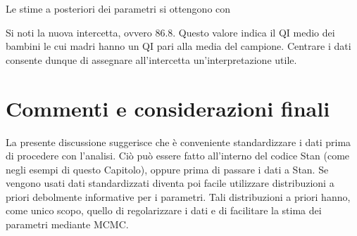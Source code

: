 \documentclass[
  11pt,
]{krantz}
\makeatletter
\newenvironment{Shaded}{\begin{snugshade}}{\end{snugshade}}
\newcommand{\CommentTok}[1]{\textcolor[rgb]{0.37,0.37,0.37}{\textit{#1}}}
\newcommand{\FunctionTok}[1]{\textcolor[rgb]{0,0,0}{#1}}
\newcommand{\NormalTok}[1]{#1}
\newcommand{\SpecialCharTok}[1]{\textcolor[rgb]{0,0,0}{#1}}
\newcommand{\StringTok}[1]{\textcolor[rgb]{0.5,0.5,0.5}{#1}}
\newenvironment{kframe}{%
\medskip{}
\setlength{\fboxsep}{.8em}
 \def\at@end@of@kframe{}%
 \ifinner\ifhmode%
  \def\at@end@of@kframe{\end{minipage}}%
  \begin{minipage}{\columnwidth}%
 \fi\fi%
 \def\FrameCommand##1{\hskip\@totalleftmargin \hskip-\fboxsep
 \colorbox{shadecolor}{##1}\hskip-\fboxsep
     \hskip-\linewidth \hskip-\@totalleftmargin \hskip\columnwidth}%
 \MakeFramed {\advance\hsize-\width
   \@totalleftmargin\z@ \linewidth\hsize
   \@setminipage}}%
 {\par\unskip\endMakeFramed%
 \at@end@of@kframe}
\renewenvironment{Shaded}{\begin{kframe}}{\end{kframe}}
\makeatother
\begin{document}
Le stime a posteriori dei parametri si ottengono con

\begin{Shaded}
\end{Shaded}

Si noti la nuova intercetta, ovvero 86.8. Questo valore indica il QI medio dei bambini le cui madri hanno un QI pari alla media del campione. Centrare i dati consente dunque di assegnare all'intercetta un'interpretazione utile.

\hypertarget{commenti-e-considerazioni-finali-1}{%
\section*{Commenti e considerazioni finali}\label{commenti-e-considerazioni-finali-1}}


La presente discussione suggerisce che è conveniente standardizzare i dati prima di procedere con l'analisi. Ciò può essere fatto all'interno del codice Stan (come negli esempi di questo Capitolo), oppure prima di passare i dati a Stan. Se vengono usati dati standardizzati diventa poi facile utilizzare distribuzioni a priori debolmente informative per i parametri. Tali distribuzioni a priori hanno, come unico scopo, quello di regolarizzare i dati e di facilitare la stima dei parametri mediante MCMC.

  

\printindex
\end{document}
